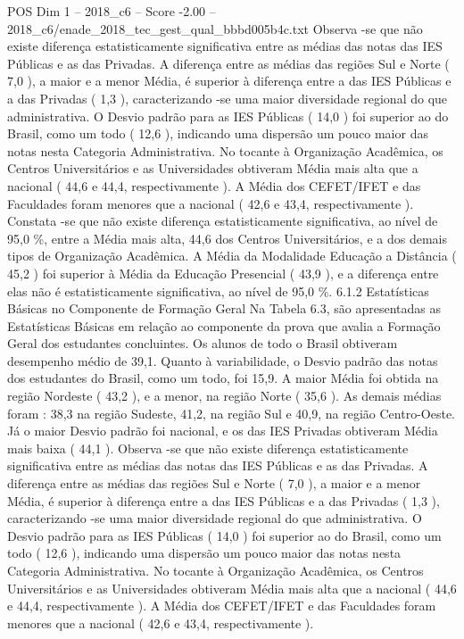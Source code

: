 \begin{textsample}{POS Dim 1 – 2018\_c6 – Score -2.00 – 2018\_c6/enade\_2018\_tec\_gest\_qual\_bbbd005b4c.txt}
Observa -se que não existe diferença estatisticamente significativa entre as médias das notas das IES Públicas e as das Privadas.
A diferença entre as médias das regiões Sul e Norte ( 7,0 ), a maior e a menor Média, é superior à diferença entre a das IES Públicas e a das Privadas ( 1,3 ), caracterizando -se uma maior diversidade regional do que administrativa.
O Desvio padrão para as IES Públicas ( 14,0 ) foi superior ao do Brasil, como um todo ( 12,6 ), indicando uma dispersão um pouco maior das notas nesta Categoria Administrativa.
No tocante à Organização Acadêmica, os Centros Universitários e as Universidades obtiveram Média mais alta que a nacional ( 44,6 e 44,4, respectivamente ).
A Média dos CEFET/IFET e das Faculdades foram menores que a nacional ( 42,6 e 43,4, respectivamente ).
Constata -se que não existe diferença estatisticamente significativa, ao nível de 95,0 \%, entre a Média mais alta, 44,6 dos Centros Universitários, e a dos demais tipos de Organização Acadêmica.
A Média da Modalidade Educação a Distância ( 45,2 ) foi superior à Média da Educação Presencial ( 43,9 ), e a diferença entre elas não é estatisticamente significativa, ao nível de 95,0 \%. 6.1.2 Estatísticas Básicas no Componente de Formação Geral Na Tabela 6.3, são apresentadas as Estatísticas Básicas em relação ao componente da prova que avalia a Formação Geral dos estudantes concluintes.
Os alunos de todo o Brasil obtiveram desempenho médio de 39,1.
Quanto à variabilidade, o Desvio padrão das notas dos estudantes do Brasil, como um todo, foi 15,9.
A maior Média foi obtida na região Nordeste ( 43,2 ), e a menor, na região Norte ( 35,6 ).
As demais médias foram : 38,3 na região Sudeste, 41,2, na região Sul e 40,9, na região Centro-Oeste.
Já o maior Desvio padrão foi nacional, e os das IES Privadas obtiveram Média mais baixa ( 44,1 ).
Observa -se que não existe diferença estatisticamente significativa entre as médias das notas das IES Públicas e as das Privadas.
A diferença entre as médias das regiões Sul e Norte ( 7,0 ), a maior e a menor Média, é superior à diferença entre a das IES Públicas e a das Privadas ( 1,3 ), caracterizando -se uma maior diversidade regional do que administrativa.
O Desvio padrão para as IES Públicas ( 14,0 ) foi superior ao do Brasil, como um todo ( 12,6 ), indicando uma dispersão um pouco maior das notas nesta Categoria Administrativa.
No tocante à Organização Acadêmica, os Centros Universitários e as Universidades obtiveram Média mais alta que a nacional ( 44,6 e 44,4, respectivamente ).
A Média dos CEFET/IFET e das Faculdades foram menores que a nacional ( 42,6 e 43,4, respectivamente ).

\end{textsample}
